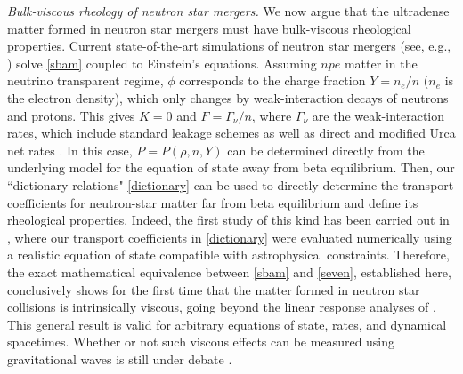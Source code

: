 \documentclass[aps,prl,noshowpacs,noshowkeys,floatfix,superscriptaddress,singlecolum,nofootinbib]{revtex4-2}
\theoremstyle{definition}
\theoremstyle{theorem}
\begin{document}
\noindent \textit{Bulk-viscous rheology of neutron star mergers.} We now argue that the ultradense matter formed in neutron star mergers must have bulk-viscous rheological properties. Current state-of-the-art simulations of neutron star mergers (see, e.g., \cite{Most:2022yhe}) solve \eqref{sbam} coupled to Einstein's equations. Assuming $npe$ matter in the neutrino transparent regime, $\phi$ corresponds to the charge fraction $Y=n_e/n$ ($n_e$ is the electron density), which only changes by weak-interaction decays of neutrons and protons. This gives $K=0$ \cite{noto_rel,comer_langlois1994} and $F=\Gamma_\nu/n$, where $\Gamma_\nu$ are the weak-interaction rates, which include standard leakage schemes \cite{1996A&A...311..532R,2003MNRAS.342..673R} as well as direct and modified Urca net rates \cite{Yakovlev:2000jp,Alford:2021ogv}. In this case, $P = P(\rho,n,Y)$ can be determined directly from the underlying model for the equation of state away from beta equilibrium. Then, our ``dictionary relations" \eqref{dictionary} can be used to directly determine the transport coefficients for neutron-star matter far from beta equilibrium and define its rheological properties. Indeed, the first study of this kind has been carried out in \cite{Yang:2023ogo}, where our transport coefficients in \eqref{dictionary} were evaluated numerically using a realistic equation of state compatible with astrophysical constraints. Therefore, the exact mathematical equivalence between \eqref{sbam} and \eqref{seven}, established here, conclusively shows for the first time that the matter formed in neutron star collisions is intrinsically viscous, going beyond the linear response analyses of \cite{Gavassino:2020kwo,Celora:2022nbp,Camelio2022}. This general result is valid for arbitrary equations of state, rates, and
dynamical spacetimes. Whether or not such viscous effects can be measured using gravitational waves is still under debate \cite{Alford:2017rxf,Most:2021zvc, Hammond:2022uua,Most:2022yhe,Chabanov:2023blf,Espino:2023dei,Ripley:2023lsq}.\\
\end{document}
